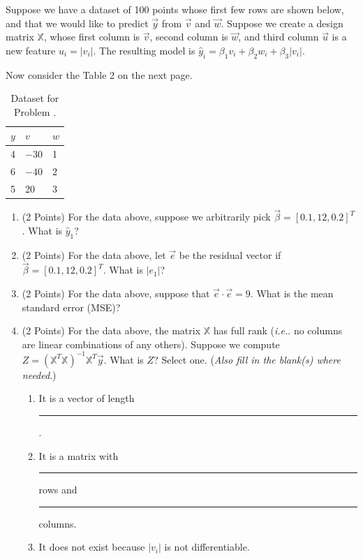 \documentclass{article}
\newcounter{problem}
\begin{document}
	\begin{problem}
		Suppose we have a dataset of 100 points whose first few rows are shown below, and that we would like to predict \(\vec{y}\) from \(\vec{v}\) and \(\vec{w}\). Suppose we create a design matrix \(\mathbb{X}\), whose first column is \(\vec{v}\), second column is \(\vec{w}\), and third column \(\vec{u}\) is a new feature \(u_i=|v_i|\). The resulting model is \(\hat{y}_i=\beta_1v_i+\beta_2w_i+\beta_3|v_i|\).
		
		Now consider the Table 2 on the next page.
		
		\begin{table}[ht]
			\centering
			\begin{tabularx}{0.5\textwidth}{|X|X|X|}
				\hline
				\(y\)&\(v\)&\(w\)\\
				\hline
				4&\(-30\)&1\\
				6&\(-40\)&2\\
				5&20&3\\
				\hline
			\end{tabularx}
			\caption{Dataset for Problem \theproblem.}
		\end{table}
	
		\begin{enumerate}[label=(\alph*)]
			\item (2 Points) For the data above, suppose we arbitrarily pick \(\vec{\beta}=[0.1,12,0.2]^T\). What is \(\hat{y}_1\)?
			\item (2 Points) For the data above, let \(\vec{e}\) be the residual vector if \(\vec{\beta}=[0.1,12,0.2]^T\). What is \(|e_1|\)?
			\item (2 Points) For the data above, suppose that \(\vec{e}\cdot\vec{e}=9\). What is the mean standard error (MSE)?
			\item (2 Points) For the data above, the matrix \(\mathbb{X}\) has full rank (\textit{i.e.}. no columns are linear combinations of any others). Suppose we compute \(Z=(\mathbb{X}^T\mathbb{X})^{-1}\mathbb{X}^T\vec{y}\). What is \(Z\)? Select one. (\textit{Also fill in the blank(s) where needed}.)
			
			\begin{enumerate}[label=\Roman*.]
				\item It is a vector of length \rule{4em}{0.1px}.
				\item It is a matrix with \rule{4em}{0.1px} rows and \rule{4em}{0.1px} columns.
				\item It does not exist because \(|v_i|\) is not differentiable.
			\end{enumerate}
		\end{enumerate}
	\end{problem}
\end{document}
